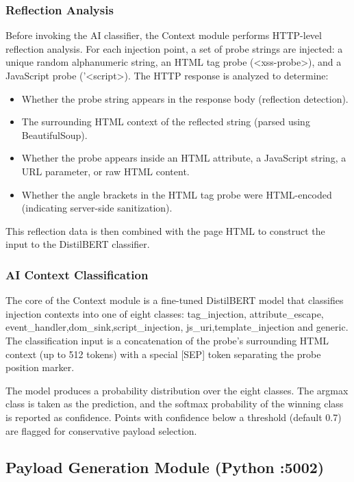 \subsubsection{Reflection Analysis}
Before invoking the AI classifier, the Context module performs HTTP-level reflection analysis. For each injection point, a set of probe strings are injected: a unique random alphanumeric string, an HTML tag probe (<xss-probe>), and a JavaScript probe ('<script>). The HTTP response is analyzed to determine:
\begin{itemize}
    \item Whether the probe string appears in the response body (reflection detection).
    \item The surrounding HTML context of the reflected string (parsed using BeautifulSoup).
    \item Whether the probe appears inside an HTML attribute, a JavaScript string, a URL parameter, or raw HTML content.
    \item Whether the angle brackets in the HTML tag probe were HTML-encoded (indicating server-side sanitization).
\end{itemize}
This reflection data is then combined with the page HTML to construct the input to the DistilBERT classifier.


\subsubsection{AI Context Classification}

The core of the Context module is a fine-tuned DistilBERT model that classifies injection contexts into one of eight classes: tag\_\allowbreak injection, attribute\_\allowbreak escape, event\_\allowbreak handler,dom\_\allowbreak sink,script\_\allowbreak injection, js\_\allowbreak uri,template\_\allowbreak injection and generic. The classification input is a concatenation of the probe's surrounding HTML context (up to 512 tokens) with a special [SEP] token separating the probe position marker.

The model produces a probability distribution over the eight classes. The argmax class is taken as the prediction, and the softmax probability of the winning class is reported as confidence. Points with confidence below a threshold (default 0.7) are flagged for conservative payload selection.

\subsection{Payload Generation Module (Python :5002)}

